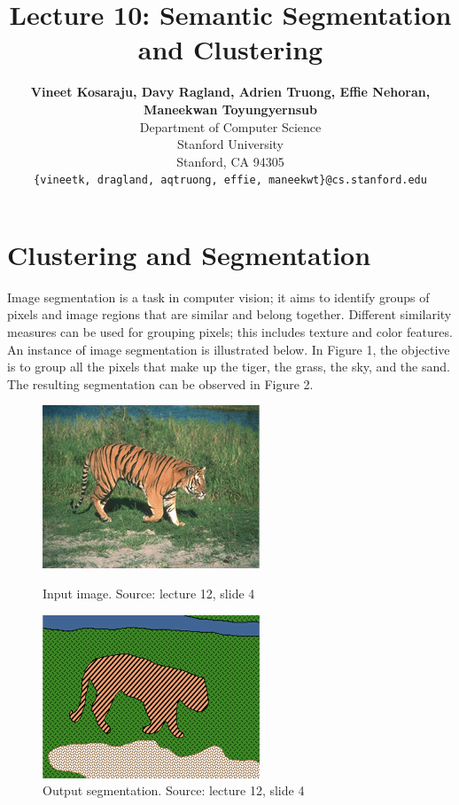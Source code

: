 \documentclass{article}
\title{Lecture 10: Semantic Segmentation and Clustering}
\author{
  \textbf{Vineet Kosaraju, Davy Ragland, Adrien Truong, Effie Nehoran, Maneekwan Toyungyernsub} \\
  Department of Computer Science\\
  Stanford University\\
  Stanford, CA 94305 \\
  \texttt{\{vineetk, dragland, aqtruong, effie, maneekwt\}@cs.stanford.edu} \\
}
\begin{document}
\maketitle

\section{Clustering and Segmentation}
Image segmentation is a task in computer vision; it aims to identify groups of pixels and image regions that are similar and belong together. Different similarity measures can be used for grouping pixels; this includes texture and color features. An instance of image segmentation is illustrated below. In Figure 1, the objective is to group all the pixels that make up the tiger, the grass, the sky, and the sand. The resulting segmentation can be observed in Figure 2.

\begin{figure}[!htb]
   \begin{minipage}{0.48\textwidth}
     \centering
     \includegraphics[width=.7\linewidth]{tiger.png}
     \caption{Input image. Source: lecture 12, slide 4}
   \end{minipage}\hfill
   \begin {minipage}{0.48\textwidth}
     \centering
     \includegraphics[width=.7\linewidth]{tiger-segmented.png}
     \caption{Output segmentation. Source: lecture 12, slide 4}
   \end{minipage}
\end{figure}
\end{document}
